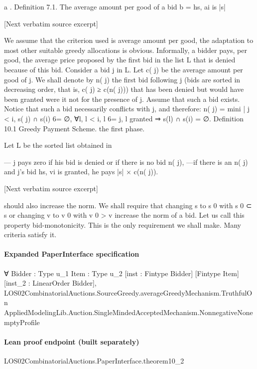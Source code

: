 \documentclass[10pt]{article}
\begin{document}
\begin{ReviewVerbatim}

a
.
Definition 7.1. The average amount per good of a bid b = hs, ai is |s|

[Next verbatim source excerpt]

We assume that the criterion used is average amount per good, the adaptation
to most other suitable greedy allocations is obvious. Informally, a bidder pays, per
good, the average price proposed by the first bid in the list L that is denied because
of this bid. Consider a bid j in L. Let c( j) be the average amount per good of j. We
shall denote by n( j) the first bid following j (bids are sorted in decreasing order,
that is, c( j) ≥ c(n( j))) that has been denied but would have been granted were it
not for the presence of j. Assume that such a bid exists. Notice that such a bid
necessarily conflicts with j, and therefore:
n( j) = min{i | j < i, s( j) ∩ s(i) 6= ∅, ∀l, l < i, l 6= j, l granted ⇒ s(l) ∩ s(i) = ∅}.
Definition 10.1 Greedy Payment Scheme.
the first phase.

Let L be the sorted list obtained in

— j pays zero if his bid is denied or if there is no bid n( j),
—if there is an n( j) and j’s bid hs, vi is granted, he pays |s| × c(n( j)).

[Next verbatim source excerpt]

should also increase the norm. We shall require that changing s to s 0 with s 0 ⊂ s
or changing v to v 0 with v 0 > v increase the norm of a bid. Let us call this property
bid-monotonicity. This is the only requirement we shall make. Many criteria
satisfy it.
\end{ReviewVerbatim}



\paragraph{Expanded PaperInterface specification}
\begin{ReviewVerbatim}
∀ {Bidder : Type u_1} {Item : Type u_2} [inst : Fintype Bidder] [Fintype Item] [inst_2 : LinearOrder Bidder],
  LOS02CombinatorialAuctions.SourceGreedy.averageGreedyMechanism.TruthfulOn
    AppliedModelingLib.Auction.SingleMindedAcceptedMechanism.NonnegativeNonemptyProfile
\end{ReviewVerbatim}



\paragraph{Lean proof endpoint (built separately)}\begin{ReviewVerbatim}
LOS02CombinatorialAuctions.PaperInterface.theorem10_2
\end{ReviewVerbatim}
\end{document}
